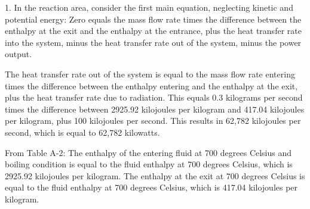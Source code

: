 1. In the reaction area, consider the first main equation, neglecting kinetic and potential energy:
Zero equals the mass flow rate times the difference between the enthalpy at the exit and the enthalpy at the entrance, plus the heat transfer rate into the system, minus the heat transfer rate out of the system, minus the power output.

The heat transfer rate out of the system is equal to the mass flow rate entering times the difference between the enthalpy entering and the enthalpy at the exit, plus the heat transfer rate due to radiation.
This equals 0.3 kilograms per second times the difference between 2925.92 kilojoules per kilogram and 417.04 kilojoules per kilogram, plus 100 kilojoules per second.
This results in 62,782 kilojoules per second, which is equal to 62,782 kilowatts.

From Table A-2:
The enthalpy of the entering fluid at 700 degrees Celsius and boiling condition is equal to the fluid enthalpy at 700 degrees Celsius, which is 2925.92 kilojoules per kilogram.
The enthalpy at the exit at 700 degrees Celsius is equal to the fluid enthalpy at 700 degrees Celsius, which is 417.04 kilojoules per kilogram.
